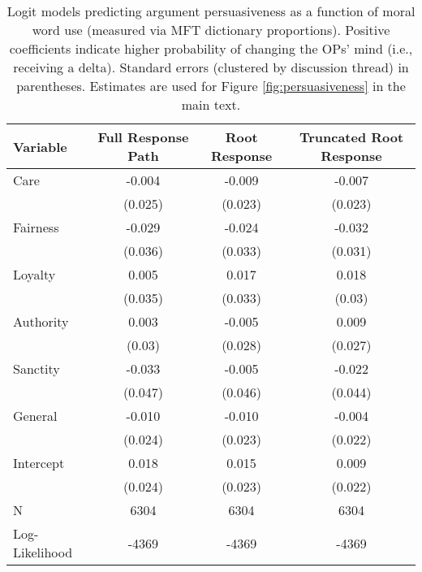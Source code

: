 \begin{table}[ht]
\centering
\caption[Logit models predicting argument persuasiveness as a 
            function of moral word use]{Logit models predicting argument persuasiveness as a 
            function of moral word use (measured via MFT dictionary proportions). 
            Positive coefficients indicate higher probability of changing the OPs'
            mind (i.e., receiving a delta). 
            Standard errors (clustered by discussion thread) in parentheses. Estimates are used for Figure
            \ref{fig:persuasiveness} in the main text.} 
\label{tab:persuasiveness}
\begingroup\footnotesize
\begin{tabular}{lccc}
  \hline
Variable & Full Response Path & Root Response & Truncated Root Response \\ 
  \hline
Care & -0.004 & -0.009 & -0.007 \\ 
   & (0.025) & (0.023) & (0.023) \\ 
  Fairness & -0.029 & -0.024 & -0.032 \\ 
   & (0.036) & (0.033) & (0.031) \\ 
  Loyalty &  0.005 &  0.017 &  0.018 \\ 
   & (0.035) & (0.033) & (0.03) \\ 
  Authority &  0.003 & -0.005 &  0.009 \\ 
   & (0.03) & (0.028) & (0.027) \\ 
  Sanctity & -0.033 & -0.005 & -0.022 \\ 
   & (0.047) & (0.046) & (0.044) \\ 
  General & -0.010 & -0.010 & -0.004 \\ 
   & (0.024) & (0.023) & (0.022) \\ 
  Intercept &  0.018 &  0.015 &  0.009 \\ 
   & (0.024) & (0.023) & (0.022) \\ 
   \hline
N & 6304 & 6304 & 6304 \\ 
  Log-Likelihood & -4369 & -4369 & -4369 \\ 
   \hline
\end{tabular}
\endgroup
\end{table}
